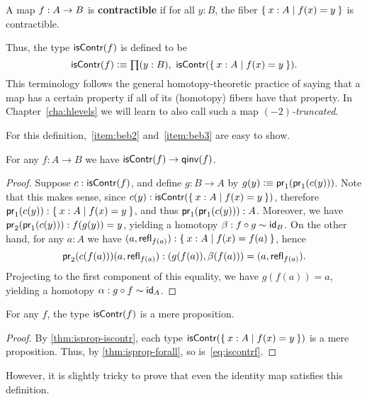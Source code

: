 \begin{defn}\label{defn:equivalence}
  A map $f:A\ra B$ is \textbf{contractible} if for all $y:B$, the fiber $\setof{x:A | f(x) = y}$ is contractible.
\end{defn}

Thus, the type $\iscontr(f)$ is defined to be
\begin{equation}
  \iscontr(f) \defeq \prd{y:B} \iscontr (\setof{x:A | f(x) = y}).\label{eq:iscontrf}
\end{equation}
This terminology follows the general homotopy-theoretic practice of saying that a map has a certain property if all of its (homotopy) fibers have that property.
In Chapter~\ref{cha:hlevels} we will learn to also call such a map \emph{$(-2)$-truncated}.

For this definition,~\ref{item:beb2} and~\ref{item:beb3} are easy to show.

\begin{lem}
  For any $f:A\to B$ we have $\iscontr(f)\to\qinv(f)$.
\end{lem}
\begin{proof}
  Suppose $c:\iscontr(f)$, and define $g:B\to A$ by $g(y)\defeq \proj1(\proj1(c(y)))$.
  Note that this makes sense, since $c(y):\iscontr (\setof{x:A | f(x) = y})$, therefore $\proj1(c(y)):\setof{x:A | f(x) = y}$, and thus $\proj1(\proj1(c(y))) : A$.
  Moreover, we have $\proj2(\proj1(c(y))) : f(g(y))=y$, yielding a homotopy $\beta:f\circ g\htpy \idfunc[B]$.
  On the other hand, for any $a:A$ we have $(a,\refl{f(a)}) : \setof{x:A | f(x) = f(a)}$, hence
  \[\proj2(c(f(a)))(a,\refl{f(a)}) : (g(f(a)),\beta(f(a))) = (a,\refl{f(a)}).\]
  Projecting to the first component of this equality, we have $g(f(a))=a$, yielding a homotopy $\alpha:g\circ f \htpy \idfunc[A]$.
\end{proof}

\begin{lem}\label{thm:contr-hprop}
  For any $f$, the type $\iscontr(f)$ is a mere proposition.
\end{lem}
\begin{proof}
  By \autoref{thm:isprop-iscontr}, each type $\iscontr (\setof{x:A | f(x) = y})$ is a mere proposition.
  Thus, by \autoref{thm:isprop-forall}, so is~\eqref{eq:iscontrf}.
\end{proof}

However, it is slightly tricky to prove that even the identity map satisfies this definition.

